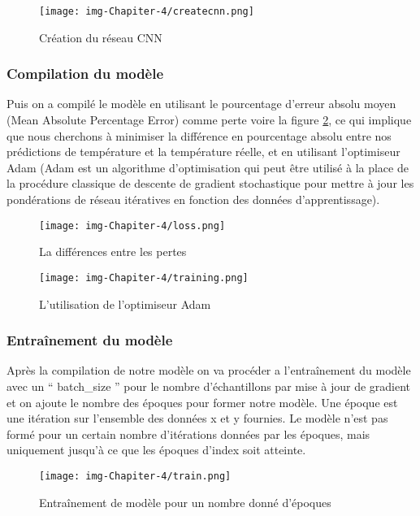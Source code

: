 \documentclass[12pt]{article}
\begin{document}
\begin{figure}[h]
	\centering
	\texttt{[image: img-Chapiter-4/createcnn.png]}
	\caption{Création du réseau CNN}
	\label{fig:CNN}
\end{figure}

\subsubsection*{Compilation du modèle}

Puis on a compilé le modèle en utilisant le pourcentage d'erreur absolu moyen (Mean Absolute Percentage Error) comme perte voire la figure \ref{fig:1002}, ce qui implique que nous cherchons à minimiser la différence en pourcentage absolu entre nos prédictions de température et la température réelle, et en utilisant l'optimiseur Adam (Adam est un algorithme d'optimisation qui peut être utilisé à la place de la procédure classique de descente de gradient stochastique pour mettre à jour les pondérations de réseau itératives en fonction des données d'apprentissage).

\begin{figure}[h]
	\centering
	\texttt{[image: img-Chapiter-4/loss.png]}
	\caption{La différences entre les pertes}
	\label{fig:1002}
\end{figure}

\begin{figure}[h]
	\centering
	\texttt{[image: img-Chapiter-4/training.png]}
	\caption{L'utilisation de l’optimiseur Adam}
\end{figure}

\subsubsection*{Entraînement du modèle}

Après la compilation de notre modèle on va procéder a l’entraînement du modèle avec un “ batch\_size ” pour le nombre d'échantillons par mise à jour de gradient et on ajoute le nombre des époques pour former notre modèle. Une époque est une itération sur l'ensemble des données x et y fournies. Le modèle n'est pas formé pour un certain nombre d'itérations données par les époques, mais uniquement jusqu'à ce que les époques d'index soit atteinte.

\begin{figure}[h]
	\centering
	\texttt{[image: img-Chapiter-4/train.png]}
	\caption{Entraînement de modèle pour un nombre donné d’époques}
\end{figure}
\end{document}
